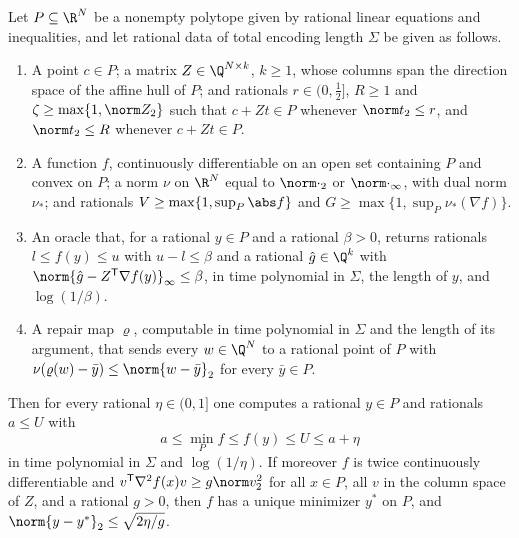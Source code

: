 \begin{lemma}\label{lem:sp:gls}
Let $P\subseteq\R^N$ be a nonempty polytope given by rational linear
equations and inequalities, and let rational data of total encoding length
$\Sigma$ be given as follows.
\begin{enumerate}[label=(\alph*)]
\item A point $c\in P$; a matrix $Z\in\Q^{N\times k}$, $k\ge1$, whose columns
span the direction space of the affine hull of $P$; and rationals
$r\in(0,\frac12]$, $R\ge1$ and $\zeta\ge\max\{1,\norm Z_2\}$ such that
$c+Zt\in P$ whenever $\norm t_2\le r$, and $\norm t_2\le R$ whenever
$c+Zt\in P$.
\item A function $f$, continuously differentiable on an open set containing
$P$ and convex on $P$; a norm $\nu$ on $\R^N$ equal to $\norm\cdot_2$ or
$\norm\cdot_\infty$, with dual norm $\nu_*$; and rationals
$V\ge\max\{1,\sup_P\abs f\}$ and $G\ge\max\{1,\sup_P\nu_*(\nabla f)\}$.
\item An oracle that, for a rational $y\in P$ and a rational $\beta>0$,
returns rationals $l\le f(y)\le u$ with $u-l\le\beta$ and a rational
$\hat g\in\Q^k$ with $\norm{\hat g-Z^{\mathsf T}\nabla f(y)}_\infty\le\beta$,
in time polynomial in $\Sigma$, the length of $y$, and $\log(1/\beta)$.
\item A repair map $\varrho$, computable in time polynomial in $\Sigma$ and
the length of its argument, that sends every $w\in\Q^N$ to a rational point
of $P$ with $\nu(\varrho(w)-\bar y)\le\norm{w-\bar y}_2$ for every
$\bar y\in P$.
\end{enumerate}
Then for every rational $\eta\in(0,1]$ one computes a rational $y\in P$ and
rationals $a\le U$ with
\[
 a\le\min_Pf\le f(y)\le U\le a+\eta
\]
in time polynomial in $\Sigma$ and $\log(1/\eta)$. If moreover $f$ is twice
continuously differentiable and $v^{\mathsf T}\nabla^2f(x)v\ge g\norm v_2^2$
for all $x\in P$, all $v$ in the column space of $Z$, and a rational $g>0$,
then $f$ has a unique minimizer $y^*$ on $P$, and
$\norm{y-y^*}_2\le\sqrt{2\eta/g}$.
\end{lemma}

